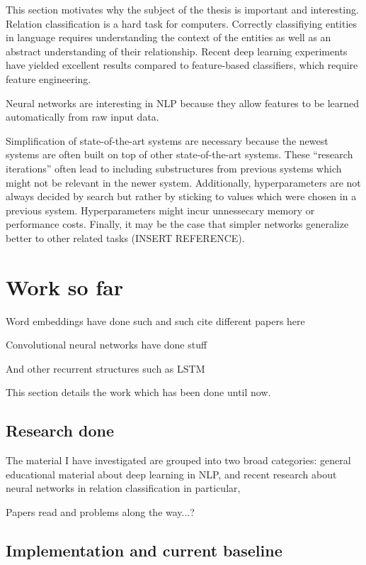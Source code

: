 \documentclass{article}
\begin{document}
This section motivates why the subject of the thesis is important and interesting.\\

Relation classification is a hard task for computers. Correctly classifiying entities in language requires understanding the context of the entities as well as an abstract understanding
of their relationship. Recent deep learning experiments have yielded excellent results compared to feature-based classifiers, which require feature engineering.   

Neural networks are interesting in NLP because they allow features to be learned automatically
from raw input data. 

Simplification of state-of-the-art systems are necessary because the newest systems are
often built on top of other state-of-the-art systems. These ``research iterations'' often
lead to including substructures from previous systems which might not be relevant in the newer system. Additionally, hyperparameters are not always decided by search but rather by sticking to values which were chosen in a previous system. Hyperparameters might incur unnessecary memory or performance costs. Finally, it may be the case that simpler networks generalize better to other related tasks (INSERT REFERENCE).  


\section{Work so far}

Word embeddings have done such and such
cite different papers here

Convolutional neural networks have done stuff

And other recurrent structures such as LSTM


This section details the work which has been done until now. 



\subsection{Research done}

The material I have investigated are grouped into two broad categories: general educational material about deep learning in NLP, and recent research about neural networks in relation classification in particular,  


Papers read and problems along the way...?


\subsection{Implementation and current baseline}
\end{document}
